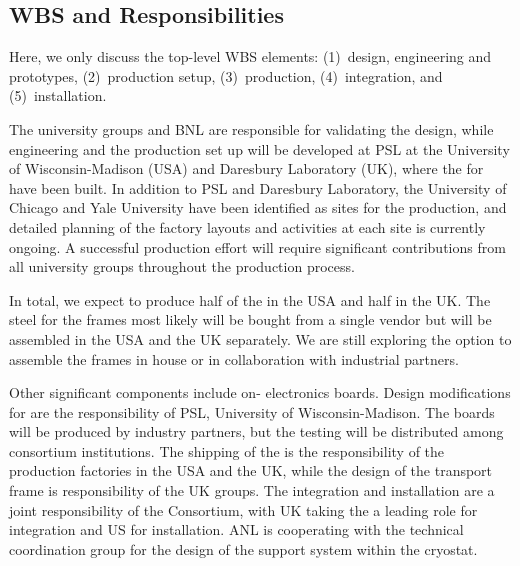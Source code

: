 \subsection{WBS and Responsibilities}
\label{sec:fdsp-apa-org-wbs}

Here, we only discuss the top-level WBS elements: (1)~design, engineering and prototypes, (2)~production setup, (3)~production, (4)~integration, and (5)~installation.

The university groups and BNL are responsible for validating  the design, while engineering and the production set up will be developed at PSL at the University of Wisconsin-Madison (USA) and Daresbury Laboratory (UK), where the  for  have been built. 
In addition to PSL and Daresbury Laboratory, the University of Chicago and Yale University have been identified as sites for the production, and detailed planning of the factory layouts and activities at each site is currently ongoing. A successful production effort will require significant contributions from all university groups throughout the production process.

In total, we expect to produce half of the  in the USA and half in the UK. The steel for the frames most likely will be bought from a single vendor but will be assembled in the USA and the UK separately. We are still exploring the option to assemble the frames in house or in collaboration with industrial partners. 

Other significant components include on- electronics boards. Design modifications for  are the responsibility of PSL, University of Wisconsin-Madison. The boards will be produced by industry partners, but the testing will be distributed among consortium institutions. The shipping of the  is the responsibility of the production factories in the USA and the UK, while the design of the  transport frame is responsibility of the UK groups. The integration and installation are a joint responsibility of the Consortium, with UK taking the a leading role for integration and US for installation. ANL is cooperating with the technical coordination group for the design of the  support system within the cryostat.
